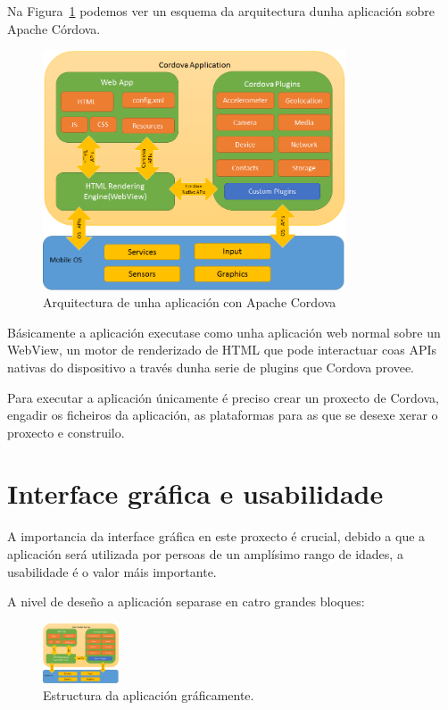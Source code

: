   Na Figura~\ref{fig:design:cordova_arquitectura} podemos ver un esquema da 
arquitectura dunha aplicación sobre Apache Córdova.

    \begin{figure}[h!]
      \begin{center}
      \includegraphics[width=0.8\textwidth]{./img/cordova_arquitectura.png}
      \caption{Arquitectura de unha aplicación con Apache Cordova}
      \label{fig:design:cordova_arquitectura}
      \end{center}
    \end{figure}

  Básicamente a aplicación executase como unha aplicación web normal sobre un 
WebView, un motor de renderizado de HTML que pode interactuar coas APIs nativas 
do dispositivo a través dunha serie de plugins que Cordova provee.

  Para executar a aplicación únicamente é preciso crear un proxecto de Cordova, 
engadir os ficheiros da aplicación, as plataformas para as que se desexe xerar 
o proxecto e construilo.
\clearpage
  \section{Interface gráfica e usabilidade}
  A importancia da interface gráfica en este proxecto é crucial, debido a que a 
aplicación será utilizada por persoas de un amplísimo rango de idades, a 
usabilidade é o valor máis importante.

  A nivel de deseño a aplicación separase en catro grandes bloques:

  \begin{figure}[h!]
    \begin{center}
    \includegraphics[width=0.2\textwidth]{./img/cordova_arquitectura.png}
    \caption{Estructura da aplicación gráficamente.}
    \end{center}
  \end{figure}

